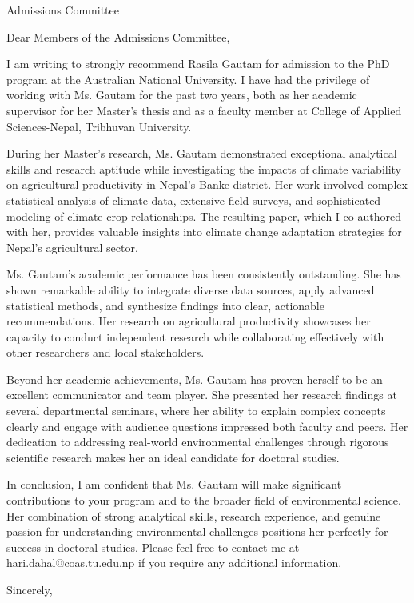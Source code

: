 \documentclass[12pt]{letter}
\begin{document}
\begin{letter}{Admissions Committee}

\opening{Dear Members of the  Admissions Committee,}

I am writing to strongly recommend Rasila Gautam for admission to the PhD program at the Australian National University. I have had the privilege of working with Ms. Gautam for the past two years, both as her academic supervisor for her Master's thesis and as a faculty member at College of Applied Sciences-Nepal, Tribhuvan University.

During her Master's research, Ms. Gautam demonstrated exceptional analytical skills and research aptitude while investigating the impacts of climate variability on agricultural productivity in Nepal's Banke district. Her work involved complex statistical analysis of climate data, extensive field surveys, and sophisticated modeling of climate-crop relationships. The resulting paper, which I co-authored with her, provides valuable insights into climate change adaptation strategies for Nepal's agricultural sector.

Ms. Gautam's academic performance has been consistently outstanding. She has shown remarkable ability to integrate diverse data sources, apply advanced statistical methods, and synthesize findings into clear, actionable recommendations. Her research on agricultural productivity showcases her capacity to conduct independent research while collaborating effectively with other researchers and local stakeholders.

Beyond her academic achievements, Ms. Gautam has proven herself to be an excellent communicator and team player. She presented her research findings at several departmental seminars, where her ability to explain complex concepts clearly and engage with audience questions impressed both faculty and peers. Her dedication to addressing real-world environmental challenges through rigorous scientific research makes her an ideal candidate for doctoral studies.

In conclusion, I am confident that Ms. Gautam will make significant contributions to your program and to the broader field of environmental science. Her combination of strong analytical skills, research experience, and genuine passion for understanding environmental challenges positions her perfectly for success in doctoral studies. Please feel free to contact me at hari.dahal@coas.tu.edu.np if you require any additional information.

\closing{Sincerely,}

\end{letter}
\end{document}
